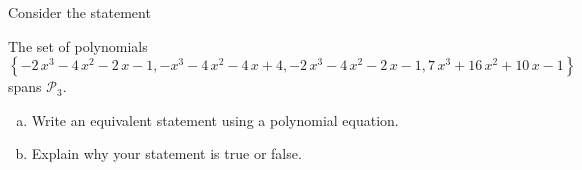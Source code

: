 
\begin{exerciseStatement}


Consider the statement 
\begin{center}\begin{minipage}{0.8\textwidth}
 The set of polynomials \( \left\{ -2 \, x^{3} - 4 \, x^{2} - 2 \, x - 1 , -x^{3} - 4 \, x^{2} - 4 \, x + 4 , -2 \, x^{3} - 4 \, x^{2} - 2 \, x - 1 , 7 \, x^{3} + 16 \, x^{2} + 10 \, x - 1 \right\} \) spans \(\mathcal{P}_3\). 
\end{minipage}\end{center}
    


\begin{enumerate}[(a)]
\item  Write an equivalent statement using a polynomial equation.
\item  Explain why your statement is true or false.
\end{enumerate}
    
\end{exerciseStatement}
    
